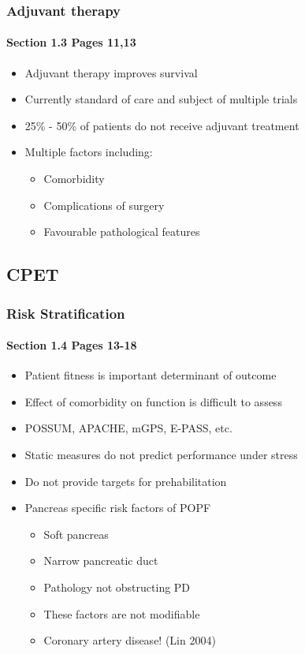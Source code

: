 \documentclass[10pt]{beamer}
\begin{document}
\begin{frame}
	\frametitle{Adjuvant therapy}
	\framesubtitle{Section 1.3 Pages 11,13 }
	\begin{itemize}
		\item Adjuvant therapy improves survival
		\item Currently standard of care and subject of multiple trials
		\item 25\% - 50\% of patients do not receive adjuvant treatment
		\item Multiple factors including:
		\begin{itemize}
			\item Comorbidity
			\item Complications of surgery
			\item Favourable pathological features
		\end{itemize}
	\end{itemize}
\end{frame}

\subsection{CPET}
\begin{frame}
	\frametitle{Risk Stratification }
	\framesubtitle{Section 1.4 Pages 13-18 }
	\begin{itemize}
		\item Patient fitness is important determinant of outcome
		\item Effect of comorbidity on function is difficult to assess
		\item POSSUM, APACHE, mGPS, E-PASS, etc.
		\item Static measures do not predict performance under stress
		\item Do not provide targets for prehabilitation
		\item Pancreas specific risk factors of POPF
		\begin{itemize}
			\item Soft pancreas
			\item Narrow pancreatic duct
			\item Pathology not obstructing PD
			\item These factors are not modifiable
			\item Coronary artery disease! (Lin 2004)
		\end{itemize}
	\end{itemize}
\end{frame}
\end{document}
